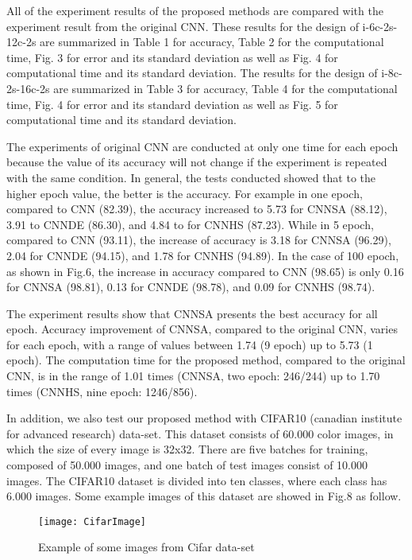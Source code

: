 \documentclass[10pt,letterpaper]{article}
\begin{document}
All of the experiment results of the proposed methods are compared with the experiment result from the original CNN. These results for the design of i-6c-2s-12c-2s are summarized in Table 1 for accuracy, Table 2 for the computational time, Fig. 3 for error and its standard deviation as well as Fig. 4 for computational time and its standard deviation. The results for the design of i-8c-2s-16c-2s are summarized in Table 3 for accuracy, Table 4 for the computational time, Fig. 4 for error and its standard deviation as well as Fig. 5 for computational time and its standard deviation. 

The experiments of original CNN are conducted at only one time for each epoch because the value of its accuracy will not change if the experiment is repeated with the same condition. In general, the tests conducted showed that to the higher epoch value, the better is the accuracy. For example in one epoch, compared to CNN (82.39), the accuracy increased to 5.73 for CNNSA (88.12), 3.91 to CNNDE (86.30), and 4.84 to for CNNHS (87.23). While in 5 epoch, compared to CNN (93.11), the increase of accuracy is 3.18 for CNNSA (96.29), 2.04 for CNNDE (94.15), and 1.78 for CNNHS (94.89). In the case of 100 epoch, as shown in Fig.6, the increase in accuracy compared to CNN (98.65) is only 0.16 for CNNSA (98.81), 0.13 for CNNDE (98.78), and 0.09 for CNNHS (98.74). 

The experiment results show that CNNSA presents the best accuracy for all epoch. Accuracy improvement of CNNSA, compared to the original CNN, varies for each epoch, with a range of values between 1.74 (9 epoch) up to 5.73 (1 epoch). The computation time for the proposed method, compared to the original CNN, is in the range of 1.01 times (CNNSA, two epoch: 246/244) up to 1.70 times (CNNHS, nine epoch: 1246/856).

In addition, we also test our proposed method with CIFAR10 (canadian institute for advanced research)  data-set. This dataset consists of 60.000 color images, in which the size of every image is 32x32. There are five batches for training, composed of 50.000 images, and one batch of test images consist of 10.000 images. The CIFAR10 dataset is divided into ten classes, where each class has 6.000 images. Some example images of this dataset are showed in Fig.8 as follow.

\begin{figure}
    \texttt{[image: CifarImage]}
    \caption{Example of some images from Cifar data-set}
    \label{fig:my_label}
\end{figure}
\end{document}
